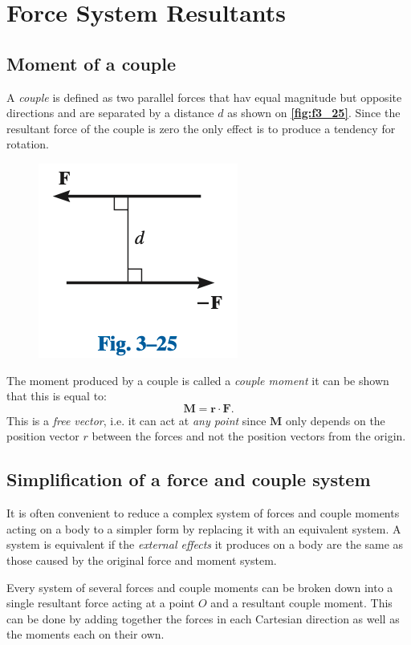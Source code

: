 
\section{Force System Resultants}

\subsection{Moment of a couple}
A \textit{couple} is defined as two parallel forces that hav equal magnitude but opposite directions and are separated by a distance $d$ as shown on \textbf{\autoref{fig:f3_25}}. Since the resultant force of the couple is zero the only effect is to produce a tendency for rotation.

\begin{figure} [ht]
  \centering
  \includegraphics[width=0.25\linewidth]{./figures/f3_25.png}
  \caption{}
  \label{fig:f3_25}
\end{figure}

The moment produced by a couple is called a \textit{couple moment} it can be shown that this is equal to:
\[ 
\textbf{M} = \textbf{r} \cdot \textbf{F}
.\]
This is a \textit{free vector}, i.e. it can act at \textit{any point} since $\textbf{M}$ only depends on the position vector $r$ between the forces and not the position vectors from the origin.


\subsection{Simplification of a force and couple system}
It is often convenient to reduce a complex system of forces and couple moments acting on a body to a simpler form by replacing it with an equivalent system. A system is equivalent if the \textit{external effects} it produces on a body are the same as those caused by the original force and moment system. 

Every system of several forces and couple moments can be broken down into a single resultant force acting at a point $O$ and a resultant couple moment. This can be done by adding together the forces in each Cartesian direction as well as the moments each on their own. 

